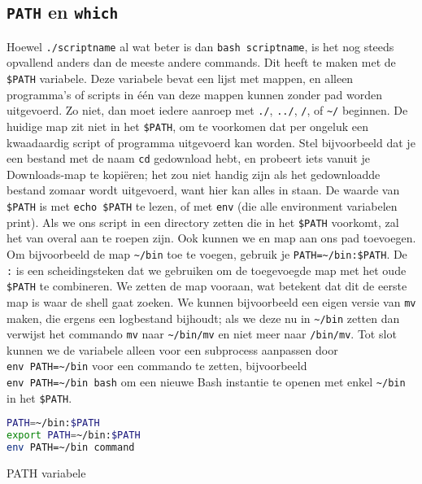 \subsection{\texorpdfstring{\texttt{PATH} en \texttt{which}}{PATH en which}}\label{path-en-which}

Hoewel \texttt{./scriptname} al wat beter is dan \texttt{bash\ scriptname}, is het nog steeds opvallend anders dan de meeste andere commands. Dit heeft te maken met de \texttt{\$PATH} variabele. Deze variabele bevat een lijst met mappen, en alleen programma's of scripts in één van deze mappen kunnen zonder pad worden uitgevoerd. Zo niet, dan moet iedere aanroep met \texttt{./}, \texttt{../}, \texttt{/}, of \texttt{\textasciitilde/} beginnen. De huidige map zit niet in het \texttt{\$PATH}, om te voorkomen dat per ongeluk een kwaadaardig script of programma uitgevoerd kan worden. Stel bijvoorbeeld dat je een bestand met de naam \texttt{cd} gedownload hebt, en probeert iets vanuit je Downloads-map te kopiëren; het zou niet handig zijn als het gedownloadde bestand zomaar wordt uitgevoerd, want hier kan alles in staan. De waarde van \texttt{\$PATH} is met \texttt{echo\ \$PATH} te lezen, of met \texttt{env} (die alle environment variabelen print). Als we ons script in een directory zetten die in het \texttt{\$PATH} voorkomt, zal het van overal aan te roepen zijn. Ook kunnen we en map aan ons pad toevoegen. Om bijvoorbeeld de map \texttt{\textasciitilde/bin} toe te voegen, gebruik je \texttt{PATH=\textasciitilde/bin:\$PATH}. De \texttt{:} is een scheidingsteken dat we gebruiken om de toegevoegde map met het oude \texttt{\$PATH} te combineren. We zetten de map vooraan, wat betekent dat dit de eerste map is waar de shell gaat zoeken. We kunnen bijvoorbeeld een eigen versie van \texttt{mv} maken, die ergens een logbestand bijhoudt; als we deze nu in \texttt{\textasciitilde/bin} zetten dan verwijst het commando \texttt{mv} naar \texttt{\textasciitilde/bin/mv} en niet meer naar \texttt{/bin/mv}. Tot slot kunnen we de variabele alleen voor een subprocess aanpassen door \texttt{env\ PATH=\textasciitilde/bin} voor een commando te zetten, bijvoorbeeld \texttt{env\ PATH=\textasciitilde/bin\ bash} om een nieuwe Bash instantie te openen met enkel \texttt{\textasciitilde/bin} in het \texttt{\$PATH}.

\begin{listing}
\begin{lstlisting}[language=Bash]
PATH=~/bin:$PATH
export PATH=~/bin:$PATH
env PATH=~/bin command
\end{lstlisting}
  \caption{PATH variabele}
\end{listing}

